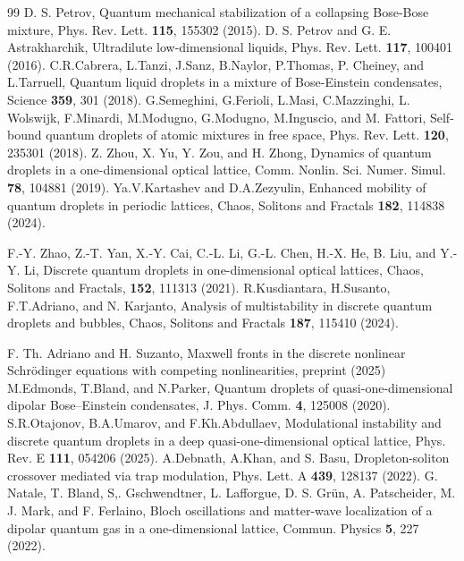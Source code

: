 \documentclass[12pt,reqno]{amsart}
\begin{document}
\begin{thebibliography}{99}
%
 D. S. Petrov, Quantum mechanical stabilization of a collapsing
Bose-Bose mixture, Phys. Rev. Lett. {\bf 115}, 155302 (2015).
%
 D. S. Petrov and G. E. Astrakharchik, Ultradilute low-dimensional liquids, Phys. Rev. Lett. {\bf 117}, 100401 (2016).
%
 C.R.Cabrera, L.Tanzi, J.Sanz, B.Naylor, P.Thomas, P. Cheiney, and L.Tarruell, Quantum liquid droplets in a mixture of Bose-Einstein condensates, Science {\bf 359}, 301 (2018).
%
 G.Semeghini, G.Ferioli, L.Masi, C.Mazzinghi, L. Wolswijk, F.Minardi, M.Modugno, G.Modugno, M.Inguscio, and M. Fattori, Self-bound quantum droplets of atomic mixtures in free space, Phys. Rev. Lett. {\bf 120}, 235301 (2018).
%
 Z. Zhou, X. Yu, Y. Zou, and H. Zhong, Dynamics of quantum droplets in a one-dimensional optical lattice, Comm. Nonlin. Sci. Numer. Simul.
{\bf 78}, 104881 (2019).
%
 Ya.V.Kartashev and D.A.Zezyulin, Enhanced mobility of quantum droplets in periodic lattices, Chaos, Solitons and Fractals {\bf 182}, 114838 (2024).
 
 F.-Y. Zhao, Z.-T. Yan, X.-Y. Cai, C.-L. Li,
G.-L. Chen, H.-X. He, B. Liu, and Y.-Y. Li, Discrete quantum droplets in one-dimensional optical lattices, Chaos, Solitons and Fractals, {\bf 152},  111313 (2021).
%
 R.Kusdiantara, H.Susanto, F.T.Adriano, and N. Karjanto, Analysis of multistability in discrete quantum droplets and bubbles, Chaos, Solitons and Fractals {\bf 187},  115410 (2024).

 F. Th. Adriano and H. Suzanto, Maxwell fronts in the discrete nonlinear Schrödinger equations with competing nonlinearities, preprint (2025)
%
 M.Edmonds, T.Bland, and N.Parker, Quantum droplets of quasi-one-dimensional dipolar Bose–Einstein condensates, J. Phys. Comm. 
{\bf 4}, 125008 (2020).
%
 S.R.Otajonov, B.A.Umarov, and F.Kh.Abdullaev, 
Modulational instability and discrete quantum droplets in a deep
quasi-one-dimensional optical lattice, Phys. Rev. E {\bf 111}, 054206 (2025).
%
 A.Debnath, A.Khan, and S. Basu, Dropleton-soliton crossover mediated via trap modulation, Phys. Lett. A {\bf 439}, 128137 (2022).
%
 G. Natale, T. Bland, S,. Gschwendtner, L. Lafforgue, D. S. Gr\"{u}n, A. Patscheider, M. J. Mark, and F. Ferlaino, Bloch oscillations and matter-wave localization of a dipolar quantum gas in a one-dimensional lattice, Commun. Physics {\bf 5}, 227 (2022).


\end{thebibliography}
\end{document}
